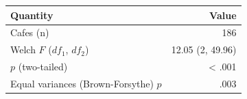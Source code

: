 \begin{tabular}{lr}
\toprule
Quantity & Value \\
\midrule
Cafes (n) & 186 \\
Welch $F$ ($df_1$, $df_2$) & 12.05 (2, 49.96) \\
$p$ (two-tailed) & \textless{} .001 \\
Equal variances (Brown-Forsythe) $p$ & .003 \\
\bottomrule
\end{tabular}
